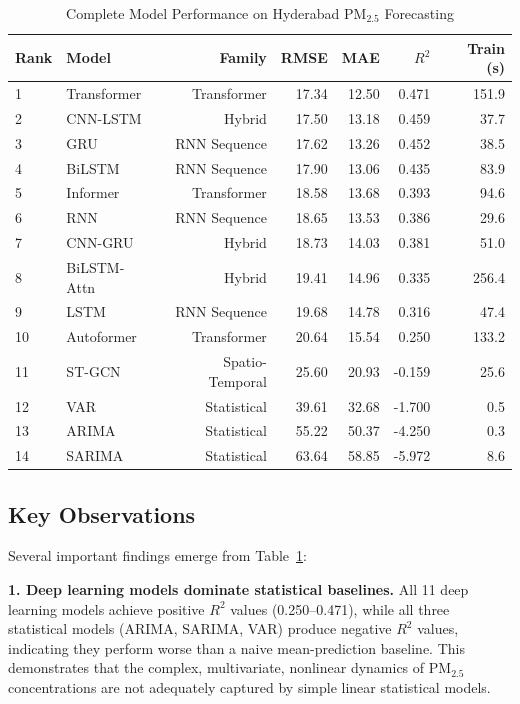 \begin{table}[H]
\centering
\caption{Complete Model Performance on Hyderabad PM$_{2.5}$ Forecasting}
\label{tab:all_results}
\begin{tabular}{llrrrrr}
\toprule
\textbf{Rank} & \textbf{Model} & \textbf{Family} & \textbf{RMSE} & \textbf{MAE} & \textbf{$R^2$} & \textbf{Train (s)} \\
\midrule
1 & Transformer & Transformer & 17.34 & 12.50 & 0.471 & 151.9 \\
2 & CNN-LSTM & Hybrid & 17.50 & 13.18 & 0.459 & 37.7 \\
3 & GRU & RNN Sequence & 17.62 & 13.26 & 0.452 & 38.5 \\
4 & BiLSTM & RNN Sequence & 17.90 & 13.06 & 0.435 & 83.9 \\
5 & Informer & Transformer & 18.58 & 13.68 & 0.393 & 94.6 \\
6 & RNN & RNN Sequence & 18.65 & 13.53 & 0.386 & 29.6 \\
7 & CNN-GRU & Hybrid & 18.73 & 14.03 & 0.381 & 51.0 \\
8 & BiLSTM-Attn & Hybrid & 19.41 & 14.96 & 0.335 & 256.4 \\
9 & LSTM & RNN Sequence & 19.68 & 14.78 & 0.316 & 47.4 \\
10 & Autoformer & Transformer & 20.64 & 15.54 & 0.250 & 133.2 \\
11 & ST-GCN & Spatio-Temporal & 25.60 & 20.93 & -0.159 & 25.6 \\
12 & VAR & Statistical & 39.61 & 32.68 & -1.700 & 0.5 \\
13 & ARIMA & Statistical & 55.22 & 50.37 & -4.250 & 0.3 \\
14 & SARIMA & Statistical & 63.64 & 58.85 & -5.972 & 8.6 \\
\bottomrule
\end{tabular}
\end{table}

\subsection{Key Observations}

Several important findings emerge from Table~\ref{tab:all_results}:

\textbf{1. Deep learning models dominate statistical baselines.} All 11 deep learning models achieve positive $R^2$ values (0.250--0.471), while all three statistical models (ARIMA, SARIMA, VAR) produce negative $R^2$ values, indicating they perform worse than a naive mean-prediction baseline. This demonstrates that the complex, multivariate, nonlinear dynamics of PM$_{2.5}$ concentrations are not adequately captured by simple linear statistical models.


